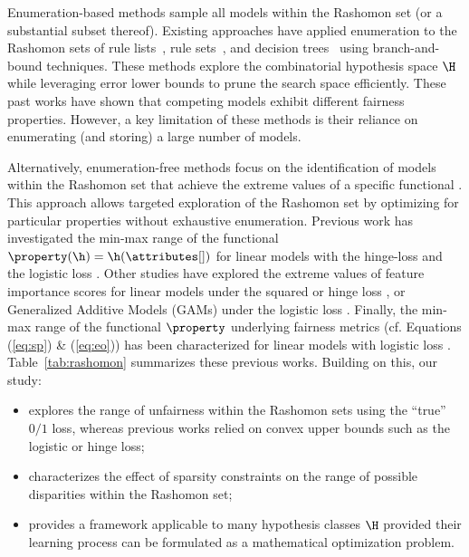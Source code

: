 Enumeration-based methods sample all models within the Rashomon set (or a substantial subset thereof). Existing approaches have applied enumeration to the Rashomon sets of rule lists~\citep{DBLP:journals/corr/abs-2204-11285}, rule sets~\citep{ciaperoni2024efficient}, and decision trees~\citep{DBLP:conf/nips/XinZ0TSR22} using branch-and-bound techniques. These methods explore the combinatorial hypothesis space $\H$ while leveraging error lower bounds to prune the search space efficiently. These past works have shown that competing models exhibit different fairness properties. However, a key limitation of these methods is their reliance on enumerating (and storing) a large number of models.



Alternatively, enumeration-free methods focus on the identification of models within the Rashomon set that achieve the extreme values of a specific functional \smash{$\property: \H \rightarrow \R$}.
This approach allows targeted exploration of the Rashomon set by optimizing for particular properties without exhaustive enumeration. Previous work has investigated the min-max range of the functional $\property(\h)=\h(\attributes[])$ for 
linear models with the hinge-loss \citep{coker2021theory} and the logistic loss \citep{DBLP:conf/aaai/Watson-DanielsP23}. 
Other studies have explored the extreme values of feature importance scores for linear models under the squared or hinge loss \citep{fisher2019all}, or Generalized Additive Models (GAMs) under the logistic loss \citep{zhong2024exploring}. 
Finally, the min-max range of the functional $\property$ underlying fairness metrics (cf. Equations (\ref{eq:sp}) \& (\ref{eq:eo})) has been characterized for linear models with logistic loss \citep{coston2021characterizing}. 
Table~\ref{tab:rashomon} summarizes these previous works. Building on this, our study:
\begin{itemize}
    \item explores the range of unfairness within the Rashomon sets using the ``true'' $0/1$ loss, whereas previous works relied on convex upper bounds such as the logistic or hinge loss;
    \item characterizes the effect of sparsity constraints on the range of possible disparities within the Rashomon set;
    \item provides a framework applicable to many hypothesis classes $\H$
    provided their learning process can be formulated as a mathematical optimization problem.
\end{itemize}